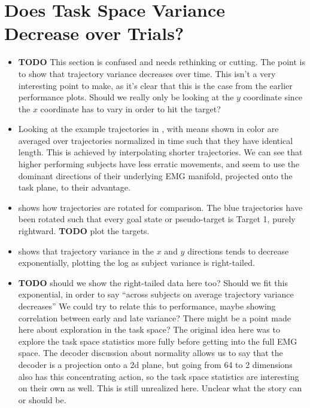 \documentclass[../main.tex]{subfiles}
\begin{document}



\section{Does Task Space Variance Decrease over Trials?}

\begin{itemize}
    \setlength\itemsep{0em}
    \item \textbf{TODO} This section is confused and needs rethinking or cutting. The point is to show that trajectory variance decreases over time. This isn't a very interesting point to make, as it's clear that this is the case from the earlier performance plots. Should we really only be looking at the $y$ coordinate since the $x$ coordinate has to vary in order to hit the target?
    \item Looking at the example trajectories in , with means shown in color are averaged over trajectories normalized in time such that they have identical length. This is achieved by interpolating shorter trajectories. We can see that higher performing subjects have less erratic movements, and seem to use the dominant directions of their underlying EMG manifold, projected onto the task plane, to their advantage.
    \item {} shows how trajectories are rotated for comparison. The blue trajectories have been rotated such that every goal state or pseudo-target is Target 1, purely rightward. \textbf{TODO} plot the targets.
    \item {} shows that trajectory variance in the $x$ and $y$ directions tends to decrease exponentially, plotting the log as subject variance is right-tailed. 
    \item \textbf{TODO} should we show the right-tailed data here too? Should we fit this exponential, in order to say ``across subjects on average trajectory variance decreases'' We could try to relate this to performance, maybe showing correlation between early and late variance? There might be a point made here about exploration in the task space? The original idea here was to explore the task space statistics more fully before getting into the full EMG space. The decoder discussion about normality allows us to say that the decoder is a projection onto a 2d plane, but going from 64 to 2 dimensions also has this concentrating action, so the task space statistics are interesting on their own as well. This is still unrealized here. Unclear what the story can or should be.
\end{itemize}
\end{document}
